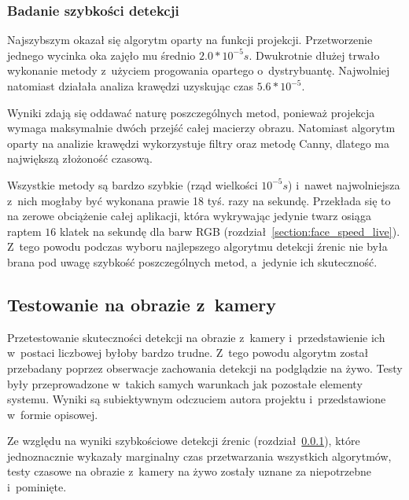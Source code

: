 \subsubsection{Badanie szybkości detekcji} \label{section:test_pupil_speed_img}



Najszybszym okazał się algorytm oparty na funkcji projekcji. Przetworzenie jednego wycinka oka zajęło mu średnio $2.0*10^{-5}s$. Dwukrotnie dłużej trwało wykonanie metody z~użyciem progowania opartego o~dystrybuantę. Najwolniej natomiast działała analiza krawędzi uzyskując czas $5.6*10^{-5}$.

\par

Wyniki zdają się oddawać naturę poszczególnych metod, ponieważ projekcja wymaga maksymalnie dwóch przejść całej macierzy obrazu. Natomiast algorytm oparty na analizie krawędzi wykorzystuje filtry oraz metodę Canny, dlatego ma największą złożoność czasową.

\par

Wszystkie metody są bardzo szybkie (rząd wielkości $10^{-5}s$) i~nawet najwolniejsza z~nich mogłaby być wykonana prawie 18 tyś. razy na sekundę. Przekłada się to na zerowe obciążenie całej aplikacji, która wykrywając jedynie twarz osiąga raptem $16$ klatek na sekundę dla barw RGB (rozdział~\ref{section:face_speed_live}). Z~tego powodu podczas wyboru najlepszego algorytmu detekcji źrenic nie była brana pod uwagę szybkość poszczególnych metod, a~jedynie ich skuteczność.




\subsection{Testowanie na obrazie z~kamery}

Przetestowanie skuteczności detekcji na obrazie z~kamery i~przedstawienie ich w~postaci liczbowej byłoby bardzo trudne. Z~tego powodu algorytm został przebadany poprzez obserwacje zachowania detekcji na podglądzie na żywo. Testy były przeprowadzone w~takich samych warunkach jak pozostałe elementy systemu. Wyniki są subiektywnym odczuciem autora projektu i~przedstawione w~formie opisowej. 

\par

Ze względu na wyniki szybkościowe detekcji źrenic (rozdział~\ref{section:test_pupil_speed_img}), które jednoznacznie wykazały marginalny czas przetwarzania wszystkich algorytmów, testy czasowe na obrazie z~kamery na żywo zostały uznane za niepotrzebne i~pominięte.

